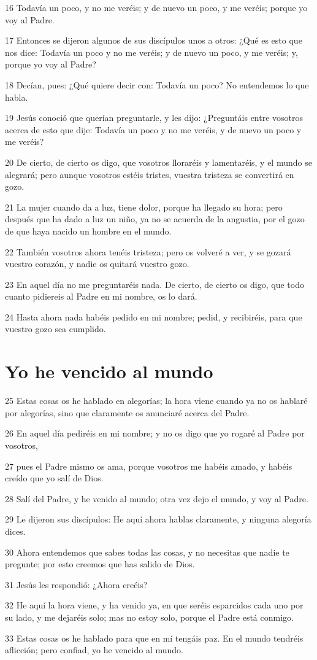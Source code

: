 \par 16 Todavía un poco, y no me veréis; y de nuevo un poco, y me veréis; porque yo voy al Padre.
\par 17 Entonces se dijeron algunos de sus discípulos unos a otros: ¿Qué es esto que nos dice: Todavía un poco y no me veréis; y de nuevo un poco, y me veréis; y, porque yo voy al Padre?
\par 18 Decían, pues: ¿Qué quiere decir con: Todavía un poco? No entendemos lo que habla.
\par 19 Jesús conoció que querían preguntarle, y les dijo: ¿Preguntáis entre vosotros acerca de esto que dije: Todavía un poco y no me veréis, y de nuevo un poco y me veréis?
\par 20 De cierto, de cierto os digo, que vosotros lloraréis y lamentaréis, y el mundo se alegrará; pero aunque vosotros estéis tristes, vuestra tristeza se convertirá en gozo.
\par 21 La mujer cuando da a luz, tiene dolor, porque ha llegado su hora; pero después que ha dado a luz un niño, ya no se acuerda de la angustia, por el gozo de que haya nacido un hombre en el mundo.
\par 22 También vosotros ahora tenéis tristeza; pero os volveré a ver, y se gozará vuestro corazón, y nadie os quitará vuestro gozo.
\par 23 En aquel día no me preguntaréis nada. De cierto, de cierto os digo, que todo cuanto pidiereis al Padre en mi nombre, os lo dará.
\par 24 Hasta ahora nada habéis pedido en mi nombre; pedid, y recibiréis, para que vuestro gozo sea cumplido.

\section*{Yo he vencido al mundo}

\par 25 Estas cosas os he hablado en alegorías; la hora viene cuando ya no os hablaré por alegorías, sino que claramente os anunciaré acerca del Padre.
\par 26 En aquel día pediréis en mi nombre; y no os digo que yo rogaré al Padre por vosotros,
\par 27 pues el Padre mismo os ama, porque vosotros me habéis amado, y habéis creído que yo salí de Dios.
\par 28 Salí del Padre, y he venido al mundo; otra vez dejo el mundo, y voy al Padre.
\par 29 Le dijeron sus discípulos: He aquí ahora hablas claramente, y ninguna alegoría dices.
\par 30 Ahora entendemos que sabes todas las cosas, y no necesitas que nadie te pregunte; por esto creemos que has salido de Dios.
\par 31 Jesús les respondió: ¿Ahora creéis?
\par 32 He aquí la hora viene, y ha venido ya, en que seréis esparcidos cada uno por su lado, y me dejaréis solo; mas no estoy solo, porque el Padre está conmigo.
\par 33 Estas cosas os he hablado para que en mí tengáis paz. En el mundo tendréis aflicción; pero confiad, yo he vencido al mundo.

